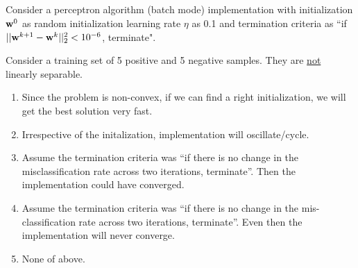 \begin{frame}
\section{}
  Consider a perceptron algorithm (batch mode) implementation with initialization ${\bf w}^0$ as random initialization learning rate $\eta $ as 0.1 and termination criteria as ``if $||{\bf w}^{k+1} - {\bf w}^k||_2^2 <10^{-6}$, terminate".

  Consider a training set of 5 positive and 5 negative samples. They are  \underline{not} linearly separable.
      \begin{enumerate}[label=(\Alph*)]
       \item Since the problem is non-convex, if we can find a right initialization, we will get the best solution very fast.
       \item Irrespective of the initalization, implementation will oscillate/cycle.  %
       \item Assume the termination criteria was ``if there is no change in the misclassification rate across two iterations, terminate''. Then the implementation could have converged.    %
       \item Assume the termination criteria was ``if there is no change in the mis-classification rate across two iterations, terminate''. Even then the implementation will never converge.
       \item None of above.    %
     \end{enumerate}
\end{frame}
